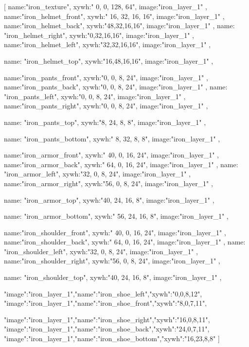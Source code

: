 [
{
name:"iron_texture",
xywh:" 0, 0, 128, 64",
image:"iron_layer_1"
},
{
name:"iron_helmet_front",
xywh:" 16, 32, 16, 16",
image:"iron_layer_1"
},
{
name:"iron_helmet_back",
xywh:"48,32,16,16",
image:"iron_layer_1"
},
{
name: "iron_helmet_right",
xywh:"0,32,16,16",
image:"iron_layer_1"
},
{
name:"iron_helmet_left",
xywh:"32,32,16,16",
image:"iron_layer_1"
},

{
name: "iron_helmet_top",
xywh:"16,48,16,16",
image:"iron_layer_1"
},


{
name:"iron_pants_front",
xywh:"0, 0, 8, 24",
image:"iron_layer_1"
},
{
name:"iron_pants_back",
xywh:"0, 0, 8, 24",
image:"iron_layer_1"
},
{
name: "iron_pants_left",
xywh:"0, 0, 8, 24",
image:"iron_layer_1"
},
{
name:"iron_pants_right",
xywh:"0, 0, 8, 24",
image:"iron_layer_1"
},

{
name: "iron_pants_top",
xywh:"8, 24, 8, 8",
image:"iron_layer_1"
},

{
name: "iron_pants_bottom",
xywh:" 8, 32, 8, 8",
image:"iron_layer_1"
},



{
name:"iron_armor_front",
xywh:" 40, 0, 16, 24",
image:"iron_layer_1"
},
{
name:"iron_armor_back",
xywh:" 64, 0, 16, 24",
image:"iron_layer_1"
},
{
name: "iron_armor_left",
xywh:"32, 0, 8, 24",
image:"iron_layer_1"
},
{
name:"iron_armor_right",
xywh:"56, 0, 8, 24",
image:"iron_layer_1"
},

{
name: "iron_armor_top",
xywh:"40, 24, 16, 8",
image:"iron_layer_1"
},

{
name: "iron_armor_bottom",
xywh:" 56, 24, 16, 8",
image:"iron_layer_1"
},



{
name:"iron_shoulder_front",
xywh:" 40, 0, 16, 24",
image:"iron_layer_1"
},
{
name:"iron_shoulder_back",
xywh:" 64, 0, 16, 24",
image:"iron_layer_1"
},
{
name: "iron_shoulder_left",
xywh:"32, 0, 8, 24",
image:"iron_layer_1"
},
{
name:"iron_shoulder_right",
xywh:"56, 0, 8, 24",
image:"iron_layer_1"
},

{
name: "iron_shoulder_top",
xywh:"40, 24, 16, 8",
image:"iron_layer_1"
},

        {"image":"iron_layer_1","name":"iron_shoe_left","xywh":"0,0,8,12"},
        {"image":"iron_layer_1","name":"iron_shoe_front","xywh":"8,0,7,11"},

        {"image":"iron_layer_1","name":"iron_shoe_right","xywh":"16,0,8,11"},
        {"image":"iron_layer_1","name":"iron_shoe_back","xywh":"24,0,7,11"},
        {"image":"iron_layer_1","name":"iron_shoe_bottom","xywh":"16,23,8,8"}
]